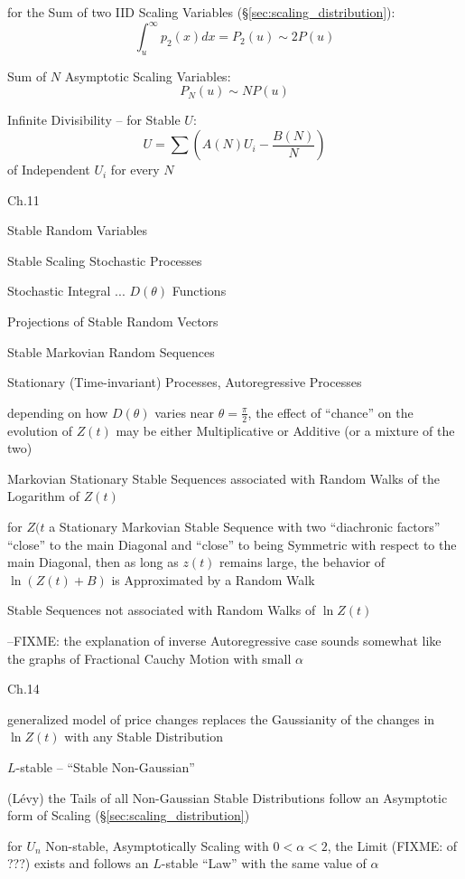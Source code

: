 for the Sum of two IID Scaling Variables (\S\ref{sec:scaling_distribution}):
\[
  \int_u^\infty p_2(x) dx = P_2(u) \sim 2 P(u)
\]

Sum of $N$ Asymptotic Scaling Variables:
\[
  P_N(u) \sim N P(u)
\]

Infinite Divisibility -- for Stable $U$:
\[
  U = \sum (A(N) U_i - \frac{B(N)}{N})
\]
of Independent $U_i$ for every $N$

Ch.11

Stable Random Variables

Stable Scaling Stochastic Processes

Stochastic Integral ... $D(\theta)$ Functions

Projections of Stable Random Vectors

Stable Markovian Random Sequences

Stationary (Time-invariant) Processes, Autoregressive Processes

depending on how $D(\theta)$ varies near $\theta = \frac{\pi}{2}$, the effect of
``chance'' on the evolution of $Z(t)$ may be either Multiplicative or Additive
(or a mixture of the two)

Markovian Stationary Stable Sequences associated with Random Walks of the
Logarithm of $Z(t)$

for $Z(t$ a Stationary Markovian Stable Sequence with two ``diachronic factors''
``close'' to the main Diagonal and ``close'' to being Symmetric with respect to
the main Diagonal, then as long as $z(t)$ remains large, the behavior of
$\ln(Z(t) + B)$ is Approximated by a Random Walk

Stable Sequences not associated with Random Walks of $\ln Z(t)$

--FIXME: the explanation of inverse Autoregressive case sounds somewhat like the
graphs of Fractional Cauchy Motion with small $\alpha$

Ch.14

generalized model of price changes replaces the Gaussianity of the changes in
$\ln Z(t)$ with any Stable Distribution

$L$-stable -- ``Stable Non-Gaussian''

(L\'evy) the Tails of all Non-Gaussian Stable Distributions follow an Asymptotic
form of Scaling (\S\ref{sec:scaling_distribution})

for $U_n$ Non-stable, Asymptotically Scaling with $0 < \alpha < 2$, the Limit
(FIXME: of ???) exists and follows an $L$-stable ``Law'' with the same value of
$\alpha$

